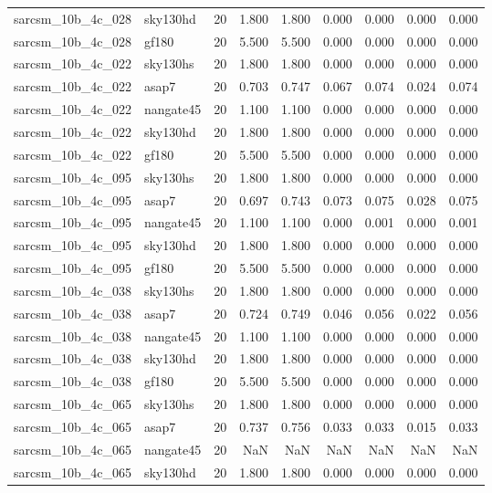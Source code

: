 \begin{tabular}{llrrrrrrr}
sarcsm\_10b\_4c\_028 & sky130hd & 20 & 1.800 & 1.800 & 0.000 & 0.000 & 0.000 & 0.000 \\
sarcsm\_10b\_4c\_028 & gf180 & 20 & 5.500 & 5.500 & 0.000 & 0.000 & 0.000 & 0.000 \\
sarcsm\_10b\_4c\_022 & sky130hs & 20 & 1.800 & 1.800 & 0.000 & 0.000 & 0.000 & 0.000 \\
sarcsm\_10b\_4c\_022 & asap7 & 20 & 0.703 & 0.747 & 0.067 & 0.074 & 0.024 & 0.074 \\
sarcsm\_10b\_4c\_022 & nangate45 & 20 & 1.100 & 1.100 & 0.000 & 0.000 & 0.000 & 0.000 \\
sarcsm\_10b\_4c\_022 & sky130hd & 20 & 1.800 & 1.800 & 0.000 & 0.000 & 0.000 & 0.000 \\
sarcsm\_10b\_4c\_022 & gf180 & 20 & 5.500 & 5.500 & 0.000 & 0.000 & 0.000 & 0.000 \\
sarcsm\_10b\_4c\_095 & sky130hs & 20 & 1.800 & 1.800 & 0.000 & 0.000 & 0.000 & 0.000 \\
sarcsm\_10b\_4c\_095 & asap7 & 20 & 0.697 & 0.743 & 0.073 & 0.075 & 0.028 & 0.075 \\
sarcsm\_10b\_4c\_095 & nangate45 & 20 & 1.100 & 1.100 & 0.000 & 0.001 & 0.000 & 0.001 \\
sarcsm\_10b\_4c\_095 & sky130hd & 20 & 1.800 & 1.800 & 0.000 & 0.000 & 0.000 & 0.000 \\
sarcsm\_10b\_4c\_095 & gf180 & 20 & 5.500 & 5.500 & 0.000 & 0.000 & 0.000 & 0.000 \\
sarcsm\_10b\_4c\_038 & sky130hs & 20 & 1.800 & 1.800 & 0.000 & 0.000 & 0.000 & 0.000 \\
sarcsm\_10b\_4c\_038 & asap7 & 20 & 0.724 & 0.749 & 0.046 & 0.056 & 0.022 & 0.056 \\
sarcsm\_10b\_4c\_038 & nangate45 & 20 & 1.100 & 1.100 & 0.000 & 0.000 & 0.000 & 0.000 \\
sarcsm\_10b\_4c\_038 & sky130hd & 20 & 1.800 & 1.800 & 0.000 & 0.000 & 0.000 & 0.000 \\
sarcsm\_10b\_4c\_038 & gf180 & 20 & 5.500 & 5.500 & 0.000 & 0.000 & 0.000 & 0.000 \\
sarcsm\_10b\_4c\_065 & sky130hs & 20 & 1.800 & 1.800 & 0.000 & 0.000 & 0.000 & 0.000 \\
sarcsm\_10b\_4c\_065 & asap7 & 20 & 0.737 & 0.756 & 0.033 & 0.033 & 0.015 & 0.033 \\
sarcsm\_10b\_4c\_065 & nangate45 & 20 & NaN & NaN & NaN & NaN & NaN & NaN \\
sarcsm\_10b\_4c\_065 & sky130hd & 20 & 1.800 & 1.800 & 0.000 & 0.000 & 0.000 & 0.000 \\

\end{tabular}
